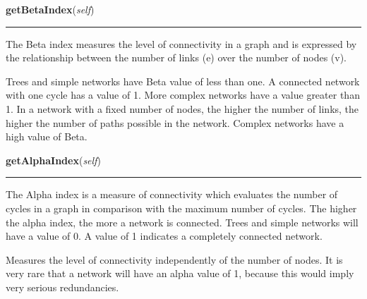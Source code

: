     \vspace{0.5ex}

    \begin{boxedminipage}{\textwidth}

    \raggedright \textbf{getBetaIndex}(\textit{self})

    \vspace{-1.5ex}

    \rule{\textwidth}{0.5\fboxrule}
    The Beta index measures the level of connectivity in a graph and is 
    expressed by the relationship between the number of links (e) over the 
    number of nodes (v).

    Trees and simple networks have Beta value of less than one. A connected
    network with one cycle has a value of 1. More complex networks have a 
    value greater than 1. In a network with a fixed number of nodes, the 
    higher the number of links, the higher the number of paths possible in 
    the network. Complex networks have a high value of Beta.

    \vspace{1ex}

    \end{boxedminipage}

    \label{Epigrass:simobj:graph:getAlphaIndex}

    \vspace{0.5ex}

    \begin{boxedminipage}{\textwidth}

    \raggedright \textbf{getAlphaIndex}(\textit{self})

    \vspace{-1.5ex}

    \rule{\textwidth}{0.5\fboxrule}
    The Alpha index is a measure of connectivity which evaluates the number
    of cycles in a graph in comparison with the maximum number of cycles. 
    The higher the alpha index, the more a network is connected. Trees and 
    simple networks will have a value of 0. A value of 1 indicates a 
    completely connected network.

    Measures the level of connectivity independently of the number of 
    nodes. It is very rare that a network will have an alpha value of 1, 
    because this would imply very serious redundancies.

    \vspace{1ex}

    \end{boxedminipage}

